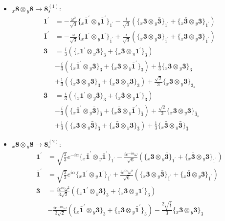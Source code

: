 \documentclass[english]{article}
\newcommand{\rep}[1]{\mathbf{#1}}
\newcommand{\repx}[2]{{}_{#2}\mathbf{#1}}
\newcommand{\tsprodx}[2]{\repx{#1}{x}\otimes\repx{#2}{y}}
\newcommand{\subcgt}[3]{\big\{ \tsprodx{#1}{#2}\big\}^{}_{#3}}
\begin{document}
\begin{itemize}
\begin{align*}
\end{align*}
\item $\tsprodx{8}{8}\to\rep{8}_{s}^{(1)}$:
\begin{align*}
\rep{1^{\prime}} & = -\frac{\omega ^2}{\sqrt{3}}\subcgt{\bar{1}^{\prime}}{\bar{1}^{\prime}}{1^{\prime}}-\frac{i}{\sqrt{3}}\left(\subcgt{3}{\bar{3}}{1^{\prime}}+\subcgt{\bar{3}}{3}{1^{\prime}}\right)
\\
\rep{\bar{1}^{\prime}} & = -\frac{\omega }{\sqrt{3}}\subcgt{1^{\prime}}{1^{\prime}}{\bar{1}^{\prime}}+\frac{i}{\sqrt{3}}\left(\subcgt{3}{\bar{3}}{\bar{1}^{\prime}}+\subcgt{\bar{3}}{3}{\bar{1}^{\prime}}\right)
\\
\rep{3} & = \frac{i}{3}\left(\subcgt{1^{\prime}}{3}{3}+\subcgt{3}{1^{\prime}}{3}\right) \\ 
 & -\frac{i}{3}\left(\subcgt{\bar{1}^{\prime}}{3}{3}+\subcgt{3}{\bar{1}^{\prime}}{3}\right)+\frac{1}{3}\subcgt{3}{3}{3} \\ 
 & +\frac{1}{3}\left(\subcgt{3}{\bar{3}}{3}+\subcgt{\bar{3}}{3}{3}\right)+\frac{\sqrt{2}}{3}\subcgt{\bar{3}}{\bar{3}}{3_{s}}
\\
\rep{\bar{3}} & = \frac{i}{3}\left(\subcgt{1^{\prime}}{\bar{3}}{\bar{3}}+\subcgt{\bar{3}}{1^{\prime}}{\bar{3}}\right) \\ 
 & -\frac{i}{3}\left(\subcgt{\bar{1}^{\prime}}{\bar{3}}{\bar{3}}+\subcgt{\bar{3}}{\bar{1}^{\prime}}{\bar{3}}\right)+\frac{\sqrt{2}}{3}\subcgt{3}{3}{\bar{3}_{s}} \\ 
 & +\frac{1}{3}\left(\subcgt{3}{\bar{3}}{\bar{3}}+\subcgt{\bar{3}}{3}{\bar{3}}\right)+\frac{1}{3}\subcgt{\bar{3}}{\bar{3}}{\bar{3}}
\end{align*}
\item $\tsprodx{8}{8}\to\rep{8}_{s}^{(2)}$:
\begin{align*}
\rep{1^{\prime}} & = \sqrt{\frac{2}{3}} e^{-i \alpha }\subcgt{\bar{1}^{\prime}}{\bar{1}^{\prime}}{1^{\prime}}-\frac{i e^{-i \alpha } \omega }{\sqrt{6}}\left(\subcgt{3}{\bar{3}}{1^{\prime}}+\subcgt{\bar{3}}{3}{1^{\prime}}\right)
\\
\rep{\bar{1}^{\prime}} & = \sqrt{\frac{2}{3}} e^{i \alpha }\subcgt{1^{\prime}}{1^{\prime}}{\bar{1}^{\prime}}+\frac{i e^{i \alpha } \omega ^2}{\sqrt{6}}\left(\subcgt{3}{\bar{3}}{\bar{1}^{\prime}}+\subcgt{\bar{3}}{3}{\bar{1}^{\prime}}\right)
\\
\rep{3} & = \frac{i e^{i \alpha } \omega ^2}{3 \sqrt{2}}\left(\subcgt{1^{\prime}}{3}{3}+\subcgt{3}{1^{\prime}}{3}\right) \\ 
 & -\frac{i e^{-i \alpha } \omega }{3 \sqrt{2}}\left(\subcgt{\bar{1}^{\prime}}{3}{3}+\subcgt{3}{\bar{1}^{\prime}}{3}\right)-\frac{2 \sqrt{\frac{2}{7}}}{3}\subcgt{3}{3}{3} \\ 

\end{align*}
\end{itemize}
\end{document}
